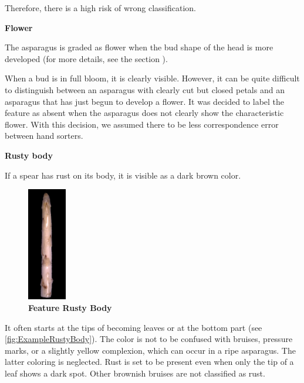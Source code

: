 Therefore, there is a high risk of wrong classification.

\bigskip
\textbf{Flower}

The asparagus is graded as flower when the bud shape of the head is more developed (for more details, see the section ).

When a bud is in full bloom, it is clearly visible. However, it can be quite difficult to distinguish between an asparagus with clearly cut but closed petals and an asparagus that has just begun to develop a flower. It was decided to label the feature as absent when the asparagus does not clearly show the characteristic flower. With this decision, we assumed there to be less correspondence error between hand sorters.

\bigskip
\textbf{Rusty body}

If a spear has rust on its body, it is visible as a dark brown color.

\begin{figure}
  \vspace{-20pt}
  \begin{center}
    \includegraphics[width=0.15\textwidth]{Figures/chapter03/example_img_rustybody.png}
  \end{center}
  \vspace{-15pt}
  \caption[Example Image Feature Rusty Body]{ \textbf{Feature Rusty Body}}
  \vspace{-40pt}
  \label{fig:ExampleRustyBody}
\end{figure}

It often starts at the tips of becoming leaves or at the bottom part (see \autoref{fig:ExampleRustyBody}). The color is not to be confused with bruises, pressure marks, or a slightly yellow complexion, which can occur in a ripe asparagus. The latter coloring is neglected.
Rust is set to be present even when only the tip of a leaf shows a dark spot. Other brownish bruises are not classified as rust.

